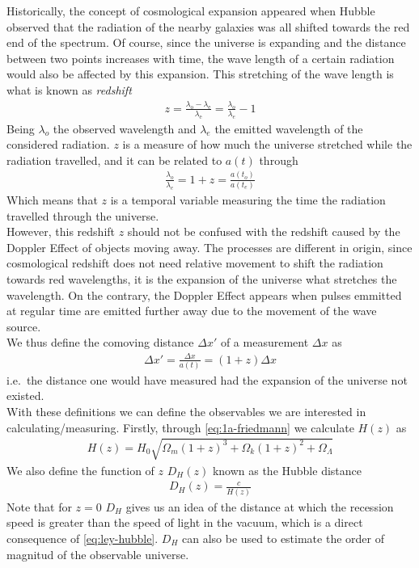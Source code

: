 Historically, the concept of cosmological expansion appeared when Hubble observed that the radiation of the nearby galaxies was all shifted towards the red end of the spectrum. Of course, since the universe is expanding and the distance between two points increases with time, the wave length of a certain radiation would also be affected by this expansion. This stretching of the wave length is what is known as \textit{redshift} 
\begin{align}
	z = \frac{\lambda_{\text{o}} - \lambda_{\text{e}}}{\lambda_{\text{e}}} = \frac{\lambda_o}{\lambda_e} - 1
	\label{eq:redshift}
\end{align}
Being $\lambda_o$ the observed wavelength and $\lambda_e$ the emitted wavelength of the considered radiation. $z$ is a measure of how much the universe stretched while the radiation travelled, and it can be related to $a(t)$ through 
\begin{align}
	\frac{\lambda_o}{\lambda_e} = 1+z = \frac{a(t_o)}{a(t_e)}
\end{align}
Which means that $z$ is a temporal variable measuring the time the radiation travelled through the universe. \\

However, this redshift $z$ should not be confused with the redshift caused by the Doppler Effect of objects moving away. The processes are different in origin, since cosmological redshift does not need relative movement to shift the radiation towards red wavelengths, it is the expansion of the universe what stretches the wavelength. On the contrary, the Doppler Effect appears when pulses emmitted at regular time are emitted further away due to the movement of the wave source. \\

We thus define the comoving distance $\Delta x'$ of a measurement $\Delta x$ as 
\begin{align}
	\Delta x' =\frac{\Delta x}{a(t)}= (1+z)\Delta x
\end{align}
i.e.\ the distance one would have measured had the expansion of the universe not existed. \\

With these definitions we can define  the observables we are interested in calculating/measuring. Firstly, through \eqref{eq:1a-friedmann} we calculate $H(z)$ as  
\begin{align}
	H(z) = H_0 \sqrt{\Omega_m(1+z)^3 + \Omega_k(1+z)^2 + \Omega_\Lambda} 
\end{align}
We also define the function of $z$ $D_H(z)$ known as the Hubble distance
\begin{align}
	D_H(z)  = \frac{c}{H(z)}
\end{align}
Note that for $z = 0$ $D_H$ gives us an idea of the distance at which the recession speed is greater than the speed of light in the vacuum, which is a direct consequence of \eqref{eq:ley-hubble}. $D_H$ can also be used to estimate the order of magnitud of the observable universe. \\

